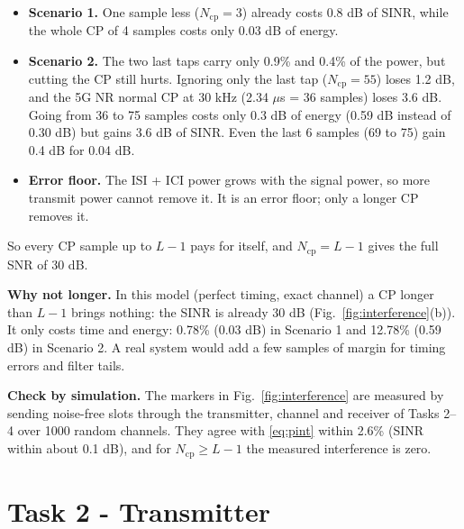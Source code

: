 \documentclass[11pt,a4paper]{article}
\newcommand{\Ncp}{N_{\mathrm{cp}}}
\begin{document}
\begin{itemize}
  \item \textbf{Scenario 1.} One sample less ($\Ncp = 3$) already costs 0.8 dB of SINR, while the
        whole CP of 4 samples costs only 0.03 dB of energy.
  \item \textbf{Scenario 2.} The two last taps carry only 0.9\% and 0.4\% of the power, but cutting the
        CP still hurts. Ignoring only the last tap ($\Ncp = 55$) loses 1.2 dB, and the 5G NR normal CP at
        30 kHz (2.34 $\mu$s = 36 samples) loses 3.6 dB. Going from 36 to 75 samples costs only 0.3 dB of energy (0.59 dB
        instead of 0.30 dB) but gains 3.6 dB of SINR. Even the last 6 samples (69 to 75) gain 0.4 dB for 0.04 dB.
  \item \textbf{Error floor.} The ISI + ICI power grows with the signal power, so more transmit power
        cannot remove it. It is an error floor; only a longer CP removes it.
\end{itemize}
So every CP sample up to $L - 1$ pays for itself, and $\Ncp = L - 1$ gives the full SNR of 30 dB.

\textbf{Why not longer.} In this model (perfect timing, exact channel) a CP longer than $L-1$ brings
nothing: the SINR is already 30 dB (Fig.~\ref{fig:interference}(b)). It only costs time and energy:
0.78\% (0.03 dB) in Scenario 1 and 12.78\% (0.59 dB) in Scenario 2. A real system would add a few
samples of margin for timing errors and filter tails.

\textbf{Check by simulation.} The markers in Fig.~\ref{fig:interference} are measured by sending
noise-free slots through the transmitter, channel and receiver of Tasks 2--4 over 1000 random channels.
They agree with \eqref{eq:pint} within 2.6\% (SINR within about 0.1 dB), and for $\Ncp \ge L - 1$ the measured
interference is zero.


\FloatBarrier
\section{Task 2 - Transmitter}
\end{document}
